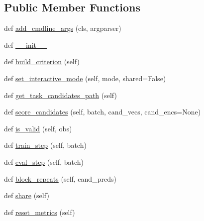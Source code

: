 \subsection*{Public Member Functions}
\begin{DoxyCompactItemize}
\item 
def \hyperlink{classparlai_1_1core_1_1torch__ranker__agent_1_1TorchRankerAgent_a8b16043428bbb29ee4a3ed28c2bbb472}{add\+\_\+cmdline\+\_\+args} (cls, argparser)
\item 
def \hyperlink{classparlai_1_1core_1_1torch__ranker__agent_1_1TorchRankerAgent_a083b1d10ef8d3d38fdfd026aea95e267}{\+\_\+\+\_\+init\+\_\+\+\_\+}
\item 
def \hyperlink{classparlai_1_1core_1_1torch__ranker__agent_1_1TorchRankerAgent_a16d004a75c5fee42cd13db4abe157b98}{build\+\_\+criterion} (self)
\item 
def \hyperlink{classparlai_1_1core_1_1torch__ranker__agent_1_1TorchRankerAgent_a9b90f2718c85b6373ead4cd207cfd3d8}{set\+\_\+interactive\+\_\+mode} (self, mode, shared=False)
\item 
def \hyperlink{classparlai_1_1core_1_1torch__ranker__agent_1_1TorchRankerAgent_a936cebe646816609dd1d4f56b9490d45}{get\+\_\+task\+\_\+candidates\+\_\+path} (self)
\item 
def \hyperlink{classparlai_1_1core_1_1torch__ranker__agent_1_1TorchRankerAgent_a65d5726a4e2098212298bc2cdf13e70f}{score\+\_\+candidates} (self, batch, cand\+\_\+vecs, cand\+\_\+encs=None)
\item 
def \hyperlink{classparlai_1_1core_1_1torch__ranker__agent_1_1TorchRankerAgent_a3a80c3eb68b019859da2a83706c3844d}{is\+\_\+valid} (self, obs)
\item 
def \hyperlink{classparlai_1_1core_1_1torch__ranker__agent_1_1TorchRankerAgent_a05ddf921f386f21116ec0ef50796987a}{train\+\_\+step} (self, batch)
\item 
def \hyperlink{classparlai_1_1core_1_1torch__ranker__agent_1_1TorchRankerAgent_a65bca7841123e4c3df1e09f8c4eb397f}{eval\+\_\+step} (self, batch)
\item 
def \hyperlink{classparlai_1_1core_1_1torch__ranker__agent_1_1TorchRankerAgent_a628050d71339298baafbaf678f94207d}{block\+\_\+repeats} (self, cand\+\_\+preds)
\item 
def \hyperlink{classparlai_1_1core_1_1torch__ranker__agent_1_1TorchRankerAgent_a9ba5899b6497645bb6d406ecc2441da7}{share} (self)
\item 
def \hyperlink{classparlai_1_1core_1_1torch__ranker__agent_1_1TorchRankerAgent_ab526b2171567fd980451a795bb639cda}{reset\+\_\+metrics} (self)

\end{DoxyCompactItemize}
